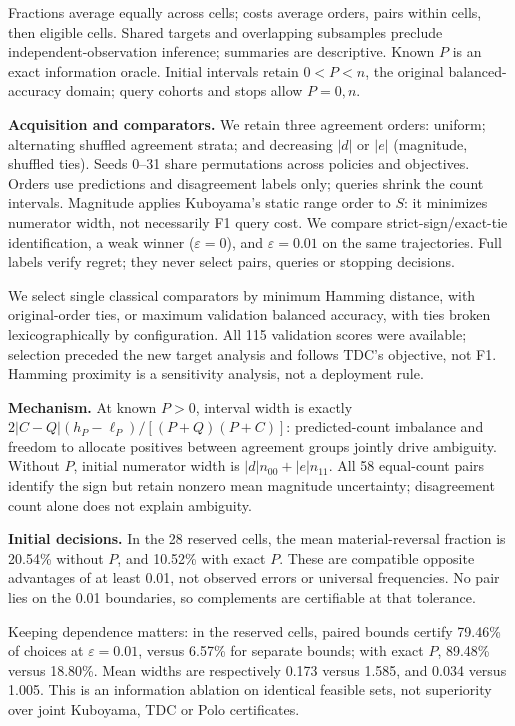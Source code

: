 \documentclass[a4paper]{esannV2}
\begin{document}
Fractions average equally across cells; costs average orders, pairs within
cells, then eligible cells. Shared targets and overlapping subsamples preclude
independent-observation inference; summaries are descriptive. Known $P$ is
an exact information oracle. Initial intervals retain $0<P<n$, the original
balanced-accuracy domain; query cohorts and stops allow $P=0,n$.

\smallskip\noindent\textbf{Acquisition and comparators.} We retain three agreement orders:
uniform; alternating shuffled agreement strata; and decreasing $|d|$ or $|e|$
(magnitude, shuffled ties). Seeds 0--31 share permutations across policies and
objectives. Orders use predictions and disagreement labels only; queries shrink
the count intervals. Magnitude applies Kuboyama's static range order \cite[Eq.~(10)]{kuboyama2026}
to $S$: it minimizes numerator width, not necessarily F1 query cost.
We compare strict-sign/exact-tie identification, a weak winner ($\varepsilon=0$),
and $\varepsilon=0.01$ on the same trajectories. Full labels verify regret;
they never select pairs, queries or stopping decisions.

We select single classical comparators by minimum Hamming distance, with
original-order ties, or maximum validation balanced accuracy, with ties broken
lexicographically by configuration.
All 115 validation scores were available; selection preceded the new target
analysis and follows TDC's objective, not F1. Hamming proximity is a sensitivity
analysis, not a deployment rule.

\smallskip\noindent\textbf{Mechanism.} At known $P>0$, interval width is exactly
$2|C-Q|(h_P-\ell_P)/[(P+Q)(P+C)]$: predicted-count imbalance and freedom to
allocate positives between agreement groups jointly drive ambiguity.
Without $P$, initial numerator width is $|d|n_{00}+|e|n_{11}$. All 58 equal-count pairs identify the sign but retain nonzero mean magnitude
uncertainty; disagreement count alone does not explain ambiguity.

\smallskip\noindent\textbf{Initial decisions.} In the 28 reserved
cells, the mean material-reversal fraction is 20.54\% without $P$, and 10.52\%
with exact $P$. These are compatible opposite advantages of at least 0.01, not observed errors
or universal frequencies. No pair lies on the 0.01 boundaries, so complements
are certifiable at that tolerance.

Keeping dependence matters: in the reserved cells, paired bounds
certify 79.46\% of choices at $\varepsilon=0.01$, versus 6.57\% for separate
bounds; with exact $P$, 89.48\% versus 18.80\%. Mean widths are respectively
0.173 versus 1.585, and 0.034 versus 1.005. This is an information ablation
on identical feasible sets, not superiority over joint Kuboyama, TDC or Polo certificates.
\end{document}
